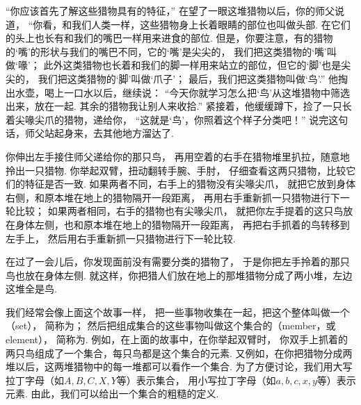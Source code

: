 “你应该首先了解这些猎物具有的特征，”
在望了一眼这堆猎物以后，你的师父说道，
“你看，和我们人类一样，这些猎物身上长着眼睛的部位也叫做头部.
在它们的头上也长有和我们的嘴巴一样用来进食的部位.
但是，你要注意，有的猎物的‘嘴’的形状与我们的嘴巴不同，它的‘嘴’是尖尖的，
我们把这类猎物的‘嘴’叫做‘喙’；
此外这类猎物也长着和我们的脚一样用来站立的部位，但它的‘脚’也是尖尖的，
我们把这类猎物的‘脚’叫做‘爪子’；
最后，我们把这类猎物叫做‘鸟’.”
他掏出水壶，喝上一口水以后，继续说：
“今天你就学习怎么把‘鸟’从这堆猎物中筛选出来，放在一起.
其余的猎物我让别人来收拾.”
紧接着，他缓缓蹲下，捡了一只长着尖喙尖爪的猎物，递给你，
“这就是‘鸟’，你照着这个样子分类吧！”
说完这句话，师父站起身来，去其他地方溜达了.

你伸出左手接住师父递给你的那只鸟，
再用空着的右手在猎物堆里扒拉，随意地拎出一只猎物.
你举起双臂，扭动翻转手腕、手肘，
仔细查看这两只猎物，比较它们的特征是否一致.
如果两者不同，右手上的猎物没有尖喙尖爪，
就把它放到身体右侧，和原本堆在地上的猎物隔开一段距离，
再用右手重新抓一只猎物进行下一轮比较；
如果两者相同，右手的猎物也有尖喙尖爪，
就把你左手提着的这只鸟放在身体左侧，也和原本堆在地上的猎物隔开一段距离，
再把右手抓着的鸟转移到左手上，
然后用右手重新抓一只猎物进行下一轮比较.

在过了一会儿后，你发现面前没有需要分类的猎物了，
于是你把左手拎着的那只鸟也放在身体左侧.
就这样，你把猎人们放在地上的那堆猎物分成了两小堆，左边这堆全是鸟.


我们经常会像上面这个故事一样，
把一些事物收集在一起，把这个整体叫做一个（set），
简称为；
然后把组成集合的这些事物叫做这个集合的（member，或element），
简称为.
例如，在上面的故事中，在你举起双臂时，
你双手上抓着的两只鸟组成了一个集合，每只鸟都是这个集合的元素.
又例如，在你把猎物分成两堆以后，这两堆猎物中的每一堆都可以看作一个集合.
为了方便讨论，我们用大写拉丁字母（如\(A,B,C,X,Y\)等）表示集合，
用小写拉丁字母（如\(a,b,c,x,y\)等）表示元素.
由此，我们可以给出一个集合的粗糙的定义.

